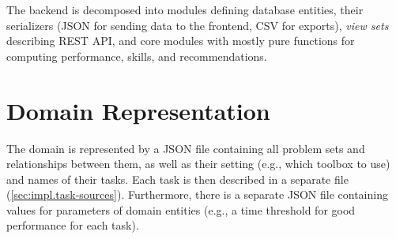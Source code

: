 
The backend is decomposed into modules defining database entities,
their serializers (JSON for sending data to the frontend, CSV for exports),
\emph{view sets} describing REST API, %
and core modules with mostly pure functions
for computing performance, skills, and recommendations.

\section{Domain Representation}

The domain is represented by a JSON file containing all problem sets %
and relationships between them, as well as their setting (e.g., which toolbox to use)
and names of their tasks.
Each task is then described in a separate file (\cref{sec:impl.task-sources}).
Furthermore, there is a separate JSON file containing values for parameters
of domain entities (e.g., a time threshold for good performance for each task).

